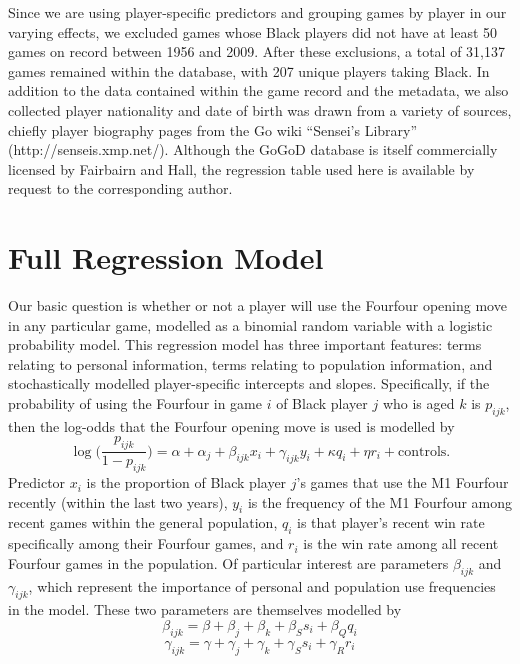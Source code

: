 \documentclass{article}
\begin{document}
Since we are using player-specific predictors and grouping games by player in our varying effects, we excluded games whose Black players did not have at least 50 games on record between 1956 and 2009. After these exclusions, a total of 31,137 games remained within the database, with 207 unique players taking Black.  In addition to the data contained within the game record and the metadata, we also collected player nationality and date of birth was drawn from a variety of sources, chiefly player biography pages from the Go wiki ``Sensei's Library'' (http://senseis.xmp.net/).  Although the GoGoD database is itself commercially licensed by Fairbairn and Hall, the regression table used here is available by request to the corresponding author. 
 

\section{Full Regression Model}

Our basic question is whether or not a player will use the Fourfour opening move in any particular game, modelled as a binomial random variable with a logistic probability model.  This regression model has three important features: terms relating to personal information, terms relating to population information, and stochastically modelled player-specific intercepts and slopes.  Specifically, if the probability of using the Fourfour in game $i$ of Black player $j$ who is aged $k$ is $p_{ijk}$, then the log-odds that the Fourfour opening move is used is modelled by
\begin{equation} \label{eq:model}
\log\bigg(\frac{p_{ijk}}{1-p_{ijk}}\bigg) = \alpha + \alpha_j + \beta_{ijk}x_i + \gamma_{ijk}y_i + \kappa q_i + \eta r_i + \textrm{controls}.
\end{equation}
Predictor $x_i$ is the proportion of Black player $j$'s games that use the M1 Fourfour recently (within the last two years), $y_i$ is the frequency of the M1 Fourfour among recent games within the general population, $q_i$ is that player's recent win rate specifically among their Fourfour games, and $r_i$ is the win rate among all recent Fourfour games in the population.  Of particular interest are parameters $\beta_{ijk}$ and $\gamma_{ijk}$, which represent the importance of personal and population use frequencies in the model.  These two parameters are themselves modelled by
	\[\beta_{ijk} = \beta + \beta_j + \beta_k + \beta_{S} s_{i} + \beta_{Q} q_{i}
\]
	\[\gamma_{ijk} = \gamma + \gamma_j + \gamma_k + \gamma_{S} s_{i} + \gamma_{R} r_{i}
\]
\end{document}
